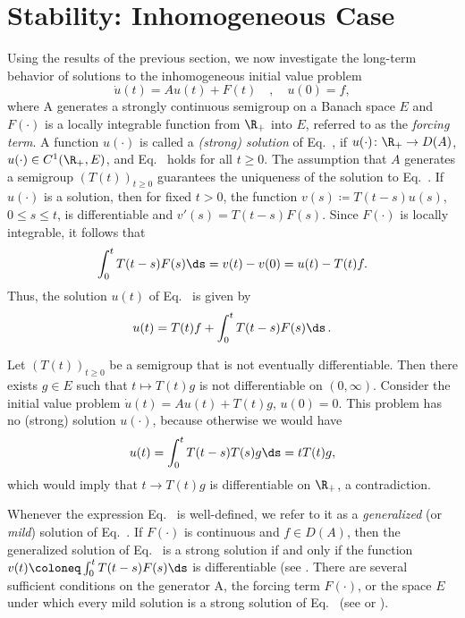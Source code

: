\section{Stability: Inhomogeneous Case}\label{sec:a4-2}
Using the results of the previous section, we now investigate the long-term behavior of solutions to the inhomogeneous initial value
problem
\begin{equation}\label{eq:a4-2.1}
\dot{u}(t) = Au(t) + F(t) \quad , \quad u(0) = f,
\end{equation}
where A generates a strongly continuous semigroup on a
Banach space $ E $ and $F(\cdot)$ is a locally integrable function from $\R_{+}$
into $ E $, referred to as the \emph{forcing term}. 
A function $u(\cdot)$ is called a \emph{(strong) solution} of Eq.~, if\/ $u(\cdot) \colon \R_{+} \to D(A)$, 
$u(\cdot) \in C^{1}(\R_{+},E)$, and Eq.~ holds for all $t \geq 0$.
The assumption that $A$ generates a semigroup $(T(t))_{t \geq 0}$
guarantees the uniqueness of the solution to Eq.~. 
If\/ $u(\cdot)$ is a solution, then for fixed $t>0$, the function $v(s) \coloneq  T(t-s)u(s)$, $0 \leq s \leq t$, is
differentiable and $v'(s) = T(t-s)F(s)$. 
Since $F(\cdot)$ is locally integrable, it follows that 
\[
\int_{0}^{t} T(t-s)F(s)  \ds = v(t) - v(0) = u(t) - T(t)f.
\]
Thus, the solution $u(t)$ of Eq.~ is given by
\begin{equation}\label{eq:a4-2.2}
u(t) = T(t)f + \int_{0}^{t} T(t-s)F(s)  \ds\,.
\end{equation}

\begin{example*} \label{ex:a4-2.1}
Let $(T(t))_{t \geq 0}$ be a semigroup that is not eventually differentiable. 
Then there
exists $g \in E$ such that $t \mapsto T(t)g$ is not differentiable on $(0,\infty)$.
Consider the initial value problem $\dot{u}(t) = Au(t) + T(t)g$, $u(0) = 0$. This problem has no
(strong) solution $u(\cdot)$, because otherwise we would have 
\begin{align*}
u(t) = \int_{0}^{t} T(t-s)T(s)g  \ds = tT(t)g,
\end{align*}
which would imply that $t\to T(t)g$ is 
differentiable on $\R_{+}$, a contradiction. 
\end{example*}


Whenever the expression Eq.~ is well-defined, we refer to it as a  \emph{generalized} (or
\emph{mild}) solution of Eq.~. 
If\/ $F(\cdot)$ is continuous and $f \in D(A)$, then
the generalized solution of Eq.~ is a strong solution if and only if the function 
$v(t) \coloneq  \int_{0}^{t} T(t-s)F(s)  \ds$ is differentiable (see \textcite[Chapter~4,2.4]{pazy:1983}. 
There are several sufficient conditions on the generator A,
the forcing term $F(\cdot)$, or the space $E$ under which every mild solution
is a strong solution of Eq.~ (see \textcite{travis:1981}
or  \textcite[Section~4.2]{pazy:1983}).

